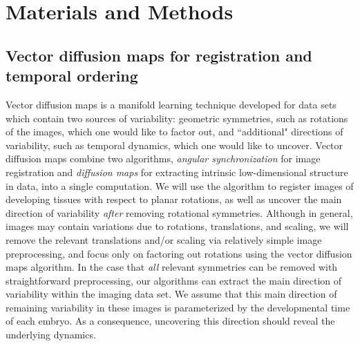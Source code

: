 \section{Materials and Methods}






\subsection{Vector diffusion maps for registration and temporal ordering}

Vector diffusion maps \citep{singer2012vector} is a manifold learning
technique developed for data sets which contain two sources of variability:
geometric symmetries, such as rotations of the images, which one would like to factor out,
and ``additional" directions of variability, such as temporal dynamics, which one would like to uncover.
%
Vector diffusion maps combine two algorithms, {\em angular synchronization} \citep{singer2011angular} for image registration and {\em diffusion maps} \citep{coifman2005geometric} for extracting intrinsic low-dimensional structure in data, into a single computation.
%
We will use the algorithm to register images of developing tissues with respect to planar rotations, as well as uncover the main direction of variability {\it after} removing rotational symmetries.
%
Although in general, images may contain variations due to rotations, translations, and scaling, we will remove the relevant translations and/or scaling via relatively simple image preprocessing, and focus only on factoring out rotations using the vector diffusion maps algorithm.
%
In the case that {\em all} relevant symmetries can be removed with straightforward preprocessing, our algorithms can extract the main direction of variability within the imaging data set.
%
We assume that this main direction of remaining variability in these images is parameterized by the developmental time of each embryo.
%
As a consequence, uncovering this direction should reveal the underlying dynamics.


